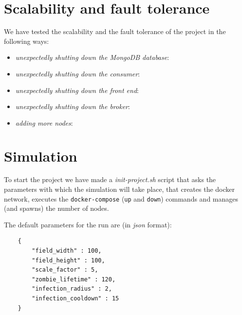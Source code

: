 \documentclass[conference]{IEEEtran}
\begin{document}
\section{Scalability and fault tolerance}

	We have tested the scalability and the fault tolerance of the project in the following ways:
	
	\begin{itemize}
		\item \textit{unexpectedly shutting down the MongoDB database}:
		\item \textit{unexpectedly shutting down the consumer}:
		\item \textit{unexpectedly shutting down the front end}:
		\item \textit{unexpectedly shutting down the broker}:
		\item \textit{adding more nodes}:
	\end{itemize}
	
\section{Simulation}\label{sec:simulation}

	To start the project we have made a \textit{init-project.sh} script that asks the parameters with which the simulation will take place, that creates the docker network, executes the \texttt{docker-compose} (\texttt{up} and \texttt{down}) commands and manages (and spawns) the number of nodes.
	

	The default parameters for the run are (in \textit{json} format):
	\begin{verbatim}
    {
        "field_width" : 100,
        "field_height" : 100,
        "scale_factor" : 5,
        "zombie_lifetime" : 120,
        "infection_radius" : 2,
        "infection_cooldown" : 15
    }
	\end{verbatim}
	
\end{document}
